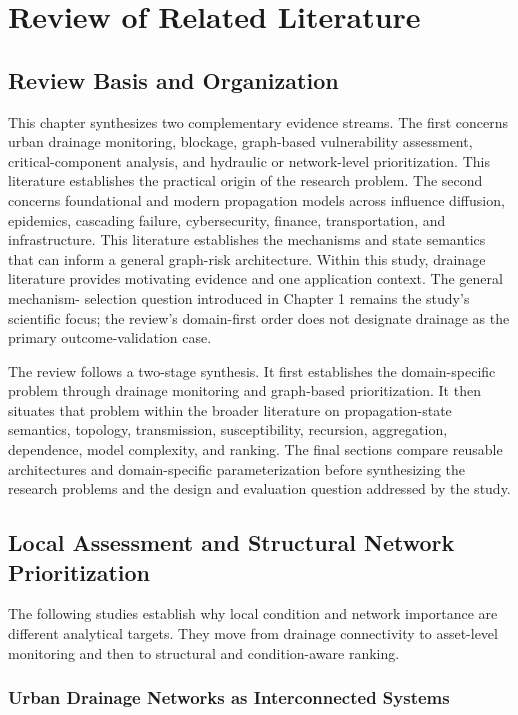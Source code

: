 \section{Review of Related Literature}\label{review-of-related-literature}

\subsection{Review Basis and Organization}\label{review-basis-and-organization}
This chapter synthesizes two complementary evidence streams. The first
concerns urban drainage monitoring, blockage, graph-based vulnerability
assessment, critical-component analysis, and hydraulic or network-level
prioritization. This literature establishes the practical origin of the
research problem. The second concerns foundational and modern
propagation models across influence diffusion, epidemics, cascading
failure, cybersecurity, finance, transportation, and infrastructure.
This literature establishes the mechanisms and state semantics that can
inform a general graph-risk architecture. Within this study, drainage literature provides
motivating evidence and one application context. The general mechanism-
selection question introduced in Chapter 1 remains the study's scientific
focus; the review's domain-first order does not designate drainage as the
primary outcome-validation case.

The review follows a two-stage synthesis. It first establishes the
domain-specific problem through drainage monitoring and graph-based
prioritization. It then situates that problem within the broader
literature on propagation-state semantics, topology, transmission,
susceptibility, recursion, aggregation, dependence, model complexity,
and ranking. The final sections compare reusable architectures and
domain-specific parameterization before synthesizing the research
problems and the design and evaluation question addressed by the study.

\subsection{Local Assessment and Structural Network Prioritization}
The following studies establish why local condition and network importance
are different analytical targets. They move from drainage connectivity to
asset-level monitoring and then to structural and condition-aware ranking.

\subsubsection{Urban Drainage Networks as Interconnected
Systems}\label{urban-drainage-networks-as-interconnected-systems}

